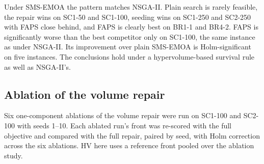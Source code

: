 \documentclass[journal]{IEEEtran}
\begin{document}
\begin{table}[!t]
\caption{SMS-EMOA, 10 seeds. Each cell gives the mean HV and the number of feasible seeds. The best mean per row is in bold. The last column gives FAPS against the best other method, as a Holm-adjusted p-value over eight instances.}\label{tab:5}
\centering\footnotesize
{}
\end{table}

Under SMS-EMOA the pattern matches NSGA-II. Plain search is rarely feasible, the repair wins on SC1-50 and SC1-100, seeding wins on SC1-250 and SC2-250 with FAPS close behind, and FAPS is clearly best on BR1-1 and BR4-2. FAPS is significantly worse than the best competitor only on SC1-100, the same instance as under NSGA-II. Its improvement over plain SMS-EMOA is Holm-significant on five instances. The conclusions hold under a hypervolume-based survival rule as well as NSGA-II's.

\subsection{Ablation of the volume repair}\label{sec:6.6}

Six one-component ablations of the volume repair were run on SC1-100 and SC2-100 with seeds 1--10. Each ablated run's front was re-scored with the full objective and compared with the full repair, paired by seed, with Holm correction across the six ablations. HV here uses a reference front pooled over the ablation study.
\end{document}
